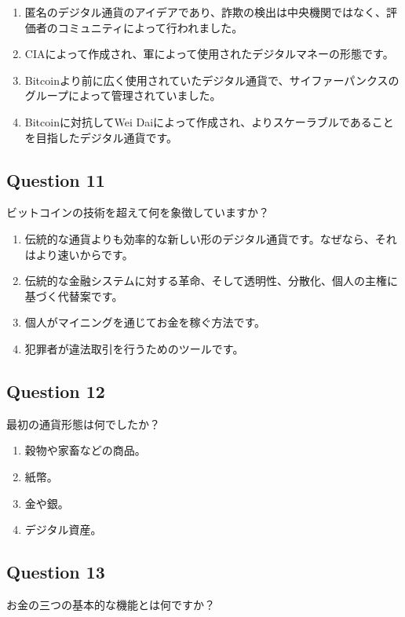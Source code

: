 \documentclass[12pt,a4paper]{article}
\begin{document}
\begin{enumerate}[label=\Alph*., leftmargin=*]
\item 匿名のデジタル通貨のアイデアであり、詐欺の検出は中央機関ではなく、評価者のコミュニティによって行われました。
\item CIAによって作成され、軍によって使用されたデジタルマネーの形態です。
\item Bitcoinより前に広く使用されていたデジタル通貨で、サイファーパンクスのグループによって管理されていました。
\item Bitcoinに対抗してWei Daiによって作成され、よりスケーラブルであることを目指したデジタル通貨です。
\end{enumerate}

\bigskip


\subsection*{Question 11}
ビットコインの技術を超えて何を象徴していますか？

\begin{enumerate}[label=\Alph*., leftmargin=*]
\item 伝統的な通貨よりも効率的な新しい形のデジタル通貨です。なぜなら、それはより速いからです。
\item 伝統的な金融システムに対する革命、そして透明性、分散化、個人の主権に基づく代替案です。
\item 個人がマイニングを通じてお金を稼ぐ方法です。
\item 犯罪者が違法取引を行うためのツールです。
\end{enumerate}

\bigskip


\subsection*{Question 12}
最初の通貨形態は何でしたか？

\begin{enumerate}[label=\Alph*., leftmargin=*]
\item 穀物や家畜などの商品。
\item 紙幣。
\item 金や銀。
\item デジタル資産。
\end{enumerate}

\bigskip


\subsection*{Question 13}
お金の三つの基本的な機能とは何ですか？
\end{document}
